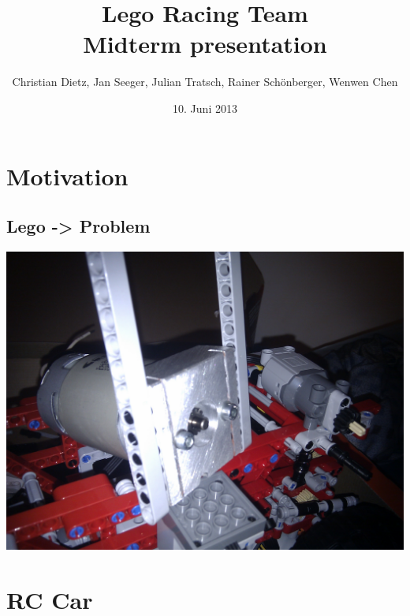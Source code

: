 \documentclass[pdf]{beamer}
\begin{document}
\title[Lego Racing Team]{Lego Racing Team\\\small{Midterm presentation}}
\author[...]{Christian Dietz, Jan Seeger, Julian Tratsch, Rainer Sch\"{o}nberger, Wenwen Chen\\}
\date{10. Juni 2013}

\subject{Midterm presentation}

\frame{
 \titlepage
}



\section{Motivation}
\subsection{Lego -> Problem}
\begin{frame}
  \begin{center}
  \includegraphics[width = \textwidth]{pics/raw/legomotor.jpg}
  \end{center}
\end{frame}

\section{RC Car}
\end{document}

